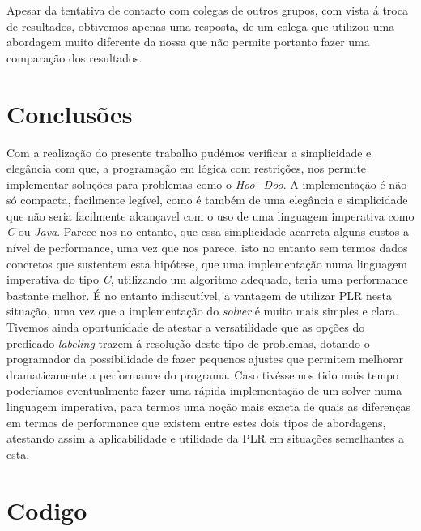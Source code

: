 \documentclass{llncs}
\begin{document}
Apesar da tentativa de contacto com colegas de outros grupos, com vista \'{a} troca de resultados, obtivemos apenas uma resposta, de um colega que utilizou uma abordagem muito diferente da nossa que n\~{a}o permite portanto fazer uma compara\c{c}\~{a}o dos resultados.

\section{Conclus\~{o}es}

Com a realiza\c{c}\~{a}o do presente trabalho pud\'{e}mos verificar a simplicidade e eleg\^{a}ncia com que, a programa\c{c}\~{a}o em l\'{o}gica com restri\c{c}\~{o}es, nos permite implementar solu\c{c}\~{o}es para problemas como o \emph{Hoo$-$Doo}.
A implementa\c{c}\~{a}o \'{e} n\~{a}o s\'{o} compacta, facilmente leg\'{i}vel, como \'{e} tamb\'{e}m de uma eleg\^{a}ncia e simplicidade que n\~{a}o seria facilmente alcan\c{c}avel com o uso de uma linguagem imperativa como \emph{C} ou \emph{Java}.
Parece-nos no entanto, que essa simplicidade acarreta alguns custos a n\'{i}vel de performance, uma vez que nos parece, isto no entanto sem termos dados concretos que sustentem esta hip\'{o}tese, que uma implementa\c{c}\~{a}o numa linguagem imperativa do tipo \emph{C}, utilizando um algoritmo adequado, teria uma performance bastante melhor.
\'{E} no entanto indiscut\'{i}vel, a vantagem de utilizar PLR nesta situa\c{c}\~{a}o, uma vez que a implementa\c{c}\~{a}o do \emph{solver} \'{e} muito mais simples e clara.
Tivemos ainda oportunidade de atestar a versatilidade que as op\c{c}\~{o}es do predicado \emph{labeling} trazem \'{a} resolu\c{c}\~{a}o deste tipo de problemas, dotando o programador da possibilidade de fazer pequenos ajustes que permitem melhorar dramaticamente a performance do programa.
Caso tiv\'{e}ssemos tido mais tempo poder\'{i}amos eventualmente fazer uma r\'{a}pida implementa\c{c}\~{a}o de um solver numa linguagem imperativa, para termos uma no\c{c}\~{a}o mais exacta de quais as diferen\c{c}as em termos de performance que existem entre estes dois tipos de abordagens, atestando assim a aplicabilidade e utilidade da PLR em situa\c{c}\~{o}es semelhantes a esta.
\nocite{sicstusManual}
\nocite{hooDoo}



\clearpage
{}
\renewcommand\refname{Bibliografia}




\newpage
\appendix


\section{Codigo}
\end{document}
